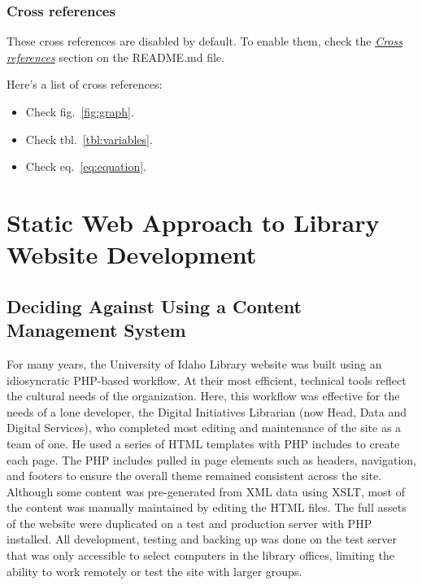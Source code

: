 \documentclass{book}
\providecommand{\tightlist}{%
  \setlength{\itemsep}{0pt}\setlength{\parskip}{0pt}}
\begin{document}
\hypertarget{cross-references}{%
\subsection{Cross references}\label{cross-references}}

These cross references are disabled by default. To enable them, check the
\emph{\href{https://github.com/wikiti/pandoc-book-template\#cross-references}{Cross
references}} section on the README.md file.

Here's a list of cross references:

\begin{itemize}
\tightlist
\item
  Check fig.~\ref{fig:graph}.
\item
  Check tbl.~\ref{tbl:variables}.
\item
  Check eq.~\ref{eq:equation}.
\end{itemize}

\hypertarget{static-web-approach-to-library-website-development}{%
\chapter{Static Web Approach to Library Website
Development}\label{static-web-approach-to-library-website-development}}

\hypertarget{deciding-against-using-a-content-management-system}{%
\section{Deciding Against Using a Content Management
System}\label{deciding-against-using-a-content-management-system}}

For many years, the University of Idaho Library website was built using an
idiosyncratic PHP-based workflow. At their most efficient, technical tools
reflect the cultural needs of the organization. Here, this workflow was
effective for the needs of a lone developer, the Digital Initiatives Librarian
(now Head, Data and Digital Services), who completed most editing and
maintenance of the site as a team of one. He used a series of HTML templates
with PHP includes to create each page. The PHP includes pulled in page
elements such as headers, navigation, and footers to ensure the overall theme
remained consistent across the site. Although some content was pre-generated
from XML data using XSLT, most of the content was manually maintained by
editing the HTML files. The full assets of the website were duplicated on a
test and production server with PHP installed. All development, testing and
backing up was done on the test server that was only accessible to select
computers in the library offices, limiting the ability to work remotely or
test the site with larger groups.
\end{document}
